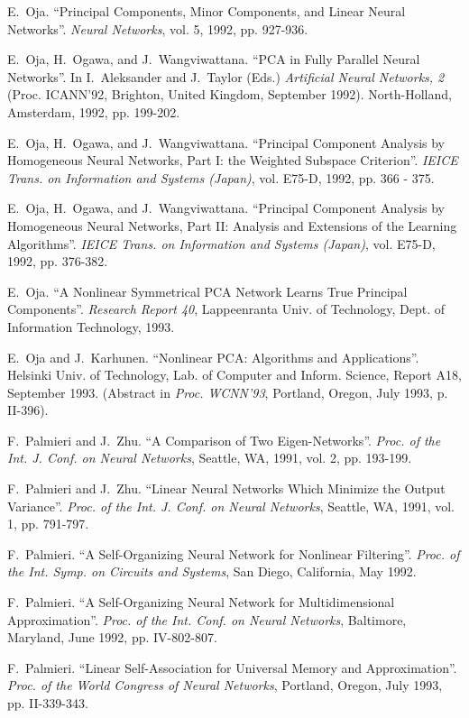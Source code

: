\begin{thebibliography}{999}
E.~Oja.
``Principal Components, Minor Components, and Linear Neural Networks''.
{\em Neural Networks}, vol. 5, 1992, pp. 927-936.

E.~Oja, H.~Ogawa, and J.~Wangviwattana.
``PCA in Fully Parallel Neural Networks''.
In I.~Aleksander and J.~Taylor (Eds.) {\em Artificial Neural
Networks, 2} (Proc. ICANN'92, Brighton, United Kingdom, September 1992).
North-Holland, Amsterdam, 1992, pp. 199-202.

E.~Oja, H.~Ogawa, and J.~Wangviwattana.
``Principal Component Analysis by Homogeneous Neural Networks, Part I:
the Weighted Subspace Criterion''.
{\em IEICE Trans. on Information and Systems (Japan)}, vol. E75-D,
1992, pp. 366 - 375.

E.~Oja, H.~Ogawa, and J.~Wangviwattana.
``Principal Component Analysis by Homogeneous Neural Networks, Part II:
Analysis and Extensions of the Learning Algorithms''.
{\em IEICE Trans. on Information and Systems (Japan)}, vol. E75-D,
1992, pp. 376-382.

E.~Oja.
``A Nonlinear Symmetrical PCA Network Learns True Principal Components''.
{\em Research Report 40}, Lappeenranta Univ. of Technology, Dept. of
Information Technology, 1993.

E.~Oja and J.~Karhunen.
``Nonlinear PCA: Algorithms and Applications''.
Helsinki Univ. of Technology, Lab. of Computer and Inform. Science,
Report A18, September 1993. (Abstract in {\em Proc. WCNN'93},
Portland, Oregon, July 1993, p. II-396).

F.~Palmieri and J.~Zhu.
``A Comparison of Two Eigen-Networks''.
{\em Proc. of the Int. J. Conf. on Neural Networks}, Seattle, WA, 1991,
vol. 2, pp. 193-199.

F.~Palmieri and J.~Zhu.
``Linear Neural Networks Which Minimize the Output Variance''.
{\em Proc. of the Int. J. Conf. on Neural Networks}, Seattle, WA, 1991,
vol. 1, pp. 791-797.

F.~Palmieri.
``A Self-Organizing Neural Network for Nonlinear Filtering''. 
{\em Proc. of the Int. Symp. on Circuits and Systems}, San Diego,
California, May 1992.

F.~Palmieri.
``A Self-Organizing Neural Network for Multidimensional Approximation''. 
{\em Proc. of the Int. Conf. on Neural Networks}, Baltimore, Maryland,
June 1992, pp. IV-802-807.

F.~Palmieri.
``Linear Self-Association for Universal Memory and Approximation''.
{\em Proc. of the World Congress of Neural Networks}, Portland, 
Oregon, July 1993, pp. II-339-343.


\end{thebibliography}
